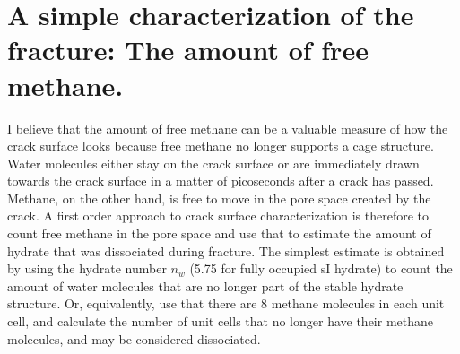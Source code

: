 \section{A simple characterization of the fracture: The amount of free methane.}
I believe that the amount of free methane can be a valuable measure of how the crack surface looks because free methane no longer supports a cage structure. Water molecules either stay on the crack surface or are immediately drawn towards the crack surface in a matter of picoseconds after a crack has passed. Methane, on the other hand, is free to move in the pore space created by the crack. A first order approach to crack surface characterization is therefore to count free methane in the pore space and use that to estimate the amount of hydrate that was dissociated during fracture. The simplest estimate is obtained by using the hydrate number $n_w$ (5.75 for fully occupied sI hydrate) to count the amount of water molecules that are no longer part of the stable hydrate structure. Or, equivalently, use that there are 8 methane molecules in each unit cell, and calculate the number of unit cells that no longer have their methane molecules, and may be considered dissociated.


